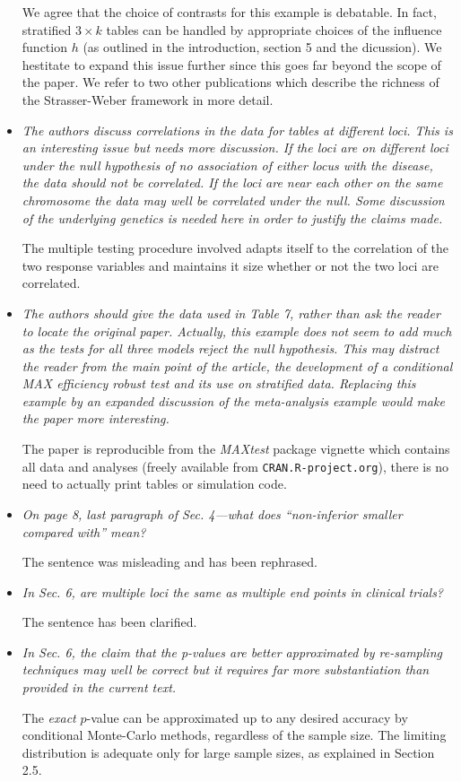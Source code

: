 \documentclass{article}
\begin{document}
\begin{itemize}
We agree that the choice of contrasts for this example is debatable.
In fact, stratified $3 \times k$ tables can be handled by appropriate
choices of the influence function $h$ (as outlined in the introduction,
section 5 and the dicussion). We hestitate to expand this issue further
since this goes far beyond the scope of the paper. We refer to two
other publications which describe the richness of the Strasser-Weber
framework in more detail.

\item
\textit{
The authors discuss correlations in the data for tables at different loci. This is an
interesting issue but needs more discussion. If the loci are on different loci under the null
hypothesis of no association of either locus with the disease, the data should not be
correlated. If the loci are near each other on the same chromosome the data may well be
correlated under the null. Some discussion of the underlying genetics is needed here in
order to justify the claims made.}

The multiple testing procedure involved adapts itself to the correlation
of the two response variables and maintains it size whether or not the
two loci are correlated.

\item
\textit{
The authors should give the data used in Table 7, rather than ask the reader to locate
the original paper. Actually, this example does not seem to add much as the tests for all
three models reject the null hypothesis. This may distract the reader from the main point
of the article, the development of a conditional MAX efficiency robust test and its use on
stratified data. Replacing this example by an expanded discussion of the meta-analysis
example would make the paper more interesting.}

The paper is reproducible from the \textit{MAXtest} package vignette which
contains all data and analyses (freely available from
\texttt{CRAN.R-project.org}), there is no need to actually print
tables or simulation code.

\item
\textit{
On page 8, last paragraph of Sec. 4—what does “non-inferior smaller compared with”
mean?}

The sentence was misleading and has been rephrased.

\item
\textit{
In Sec. 6, are multiple loci the same as multiple end points in clinical trials?}

The sentence has been clarified.

\item
\textit{
In Sec. 6, the claim that the p-values are better approximated by re-sampling techniques
may well be correct but it requires far more substantiation than provided in the current
text.
}

The \emph{exact} $p$-value can be approximated up to any desired accuracy
by conditional Monte-Carlo methods, regardless of the sample size. 
The limiting distribution is adequate only for large sample sizes, as
explained in Section 2.5.

\end{itemize}



\end{document}
